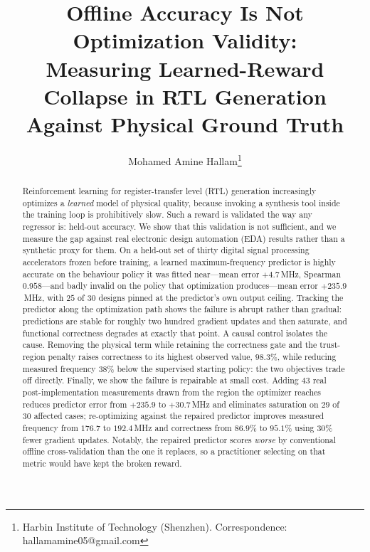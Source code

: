 \documentclass[journal]{IEEEtran}
\begin{document}
\title{Offline Accuracy Is Not Optimization Validity:\\
Measuring Learned-Reward Collapse in RTL Generation\\
Against Physical Ground Truth}

\author{Mohamed Amine Hallam\thanks{Harbin Institute of Technology (Shenzhen).
Correspondence: hallamamine05@gmail.com}}

\maketitle

\begin{abstract}
Reinforcement learning for register-transfer level (RTL) generation increasingly
optimizes a \emph{learned} model of physical quality, because invoking a
synthesis tool inside the training loop is prohibitively slow. Such a reward is
validated the way any regressor is: held-out accuracy. We show that this
validation is not sufficient, and we measure the gap against real
electronic design automation (EDA) results rather than a synthetic proxy for
them. On a held-out set of thirty digital signal processing accelerators frozen
before training, a learned maximum-frequency predictor is highly accurate on the
behaviour policy it was fitted near---mean error $+4.7$\,MHz, Spearman
$0.958$---and badly invalid on the policy that optimization produces---mean
error $+235.9$\,MHz, with $25$ of $30$ designs pinned at the predictor's own
output ceiling. Tracking the predictor along the optimization path shows the
failure is abrupt rather than gradual: predictions are stable for roughly two
hundred gradient updates and then saturate, and functional correctness degrades
at exactly that point. A causal control isolates the cause. Removing the
physical term while retaining the correctness gate and the trust-region penalty
raises correctness to its highest observed value, $98.3\%$, while reducing
measured frequency $38\%$ below the supervised starting policy: the two
objectives trade off directly. Finally, we show the failure is repairable at
small cost. Adding $43$ real post-implementation measurements drawn from the
region the optimizer reaches reduces predictor error from $+235.9$ to
$+30.7$\,MHz and eliminates saturation on $29$ of $30$ affected cases;
re-optimizing against the repaired predictor improves measured frequency from
$176.7$ to $192.4$\,MHz and correctness from $86.9\%$ to $95.1\%$ using $30\%$
fewer gradient updates. Notably, the repaired predictor scores \emph{worse} by
conventional offline cross-validation than the one it replaces, so a
practitioner selecting on that metric would have kept the broken reward.
\end{abstract}
\end{document}
